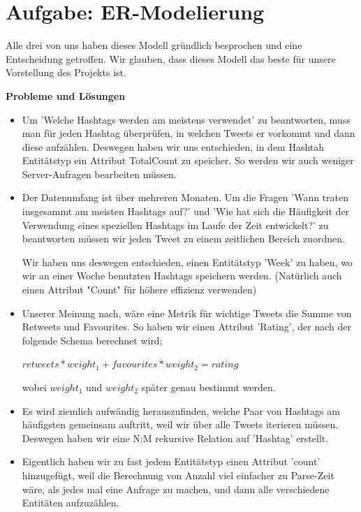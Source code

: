 \section{Aufgabe: ER-Modelierung}

Alle drei von uns haben dieses Modell gründlich besprochen und eine Entscheidung getroffen. Wir glauben, dass dieses Modell das beste für unsere Vorstellung des Projekts ist.

\textbf{Probleme und Lösungen}\\

\begin{itemize}
 \item Um 'Welche Hashtags werden am meistens verwendet' zu beantworten, muss man für jeden Hashtag überprüfen, in welchen Tweets er vorkommt und dann diese aufzählen. Deswegen haben wir uns entschieden, in dem Hashtah Entitätstyp ein Attribut TotalCount zu speicher. So werden wir auch weniger Server-Anfragen bearbeiten müssen.
 
 \item Der Datenumfang ist über mehreren Monaten. Um die Fragen 'Wann traten insgesammt am meisten Hashtags auf?' und 'Wie hat sich die Häufigkeit der Verwendung eines speziellen Hashtags im Laufe der Zeit entwickelt?' zu beantworten müssen wir jeden Tweet zu einem zeitlichen Bereich zuordnen. 
 
 Wir haben uns deswegen entschieden, einen Entitätstyp 'Week' zu haben, wo wir an einer Woche benutzten Hashtags speichern werden. (Natürlich auch einen Attribut "Count" für höhere effizienz verwenden)
 
 \item Unserer Meinung nach, wäre eine Metrik für wichtige Tweets die Summe von Retweets und Favourites. So haben wir einen Attribut 'Rating', der nach der folgende Schema berechnet wird;
 
 \begin{center}
 $retweets*weight_1 + favourites*weight_2 = rating$ 
 \end{center}
 
 wobei $weight_1$ und $weight_2$ später genau bestimmt werden.

 \item Es wird ziemlich aufwändig herauszufinden, welche Paar von Hashtags am häufigsten gemeinsam auftritt, weil wir über alle Tweets iterieren müssen. Deswegen haben wir eine N:M rekursive Relation auf 'Hashtag' erstellt.
 
 \item Eigentlich haben wir zu fast jedem Entitätstyp einen Attribut 'count' hinzugefügt, weil die Berechnung von Anzahl viel einfacher zu Parse-Zeit wäre, als jedes mal eine Anfrage zu machen, und dann alle verschiedene Entitäten aufzuzählen.
 
\end{itemize}

